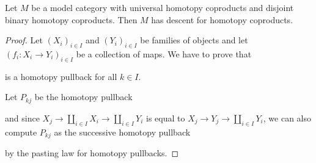 \begin{corollary}\label{cor:disjointImpliesDescent}
    Let $M$ be a model category with universal homotopy coproducts and disjoint binary homotopy coproducts.
    Then $M$ has descent for homotopy coproducts.
    \begin{proof}
        Let $\left(X_i\right)_{i\in I}$ and $\left(Y_i\right)_{i\in I}$ be families of objects and let $\left(f_i\colon X_i\to Y_i\right)_{i\in I}$ be a collection of maps.
        We have to prove that 
        \begin{center}
        \end{center}
        is a homotopy pullback for all $k\in I$.
        
        Let $P_{kj}$ be the homotopy pullback
        \begin{center}
        \end{center}
        and since $X_j\to\coprod\limits_{i\in I}X_i\to\coprod\limits_{i\in I}Y_i$ is equal to $X_j\to Y_j\to\coprod\limits_{i\in I}Y_i$, we can also compute $P_{kj}$ as the successive homotopy pullback
        \begin{center}
        \end{center}
        by the pasting law for homotopy pullbacks.


\end{proof}
\end{corollary}

